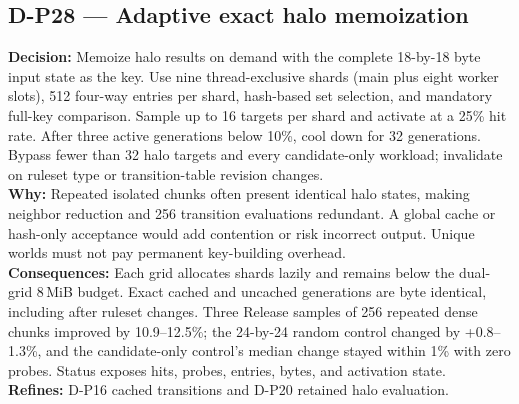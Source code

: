\subsection*{D-P28 --- Adaptive exact halo memoization}
\begin{decisionbox}[title={D-P28 \quad 2026-08-11}]
\textbf{Decision:} Memoize halo results on demand with the complete
18-by-18 byte input state as the key. Use nine thread-exclusive shards (main
plus eight worker slots), 512 four-way entries per shard, hash-based set
selection, and mandatory full-key comparison. Sample up to 16 targets per shard
and activate at a 25\% hit rate. After three active generations below 10\%,
cool down for 32 generations. Bypass fewer than 32 halo targets and every
candidate-only workload; invalidate on ruleset type or transition-table
revision changes.\\
\textbf{Why:} Repeated isolated chunks often present identical halo states,
making neighbor reduction and 256 transition evaluations redundant. A global
cache or hash-only acceptance would add contention or risk incorrect output.
Unique worlds must not pay permanent key-building overhead.\\
\textbf{Consequences:} Each grid allocates shards lazily and remains below the
dual-grid 8\,MiB budget. Exact cached and uncached generations are byte
identical, including after ruleset changes. Three Release samples of 256
repeated dense chunks improved by 10.9--12.5\%; the 24-by-24 random control
changed by +0.8--1.3\%, and the candidate-only control's median change stayed
within 1\% with zero probes. Status exposes hits, probes, entries, bytes, and
activation state.\\
\textbf{Refines:} D-P16 cached transitions and D-P20 retained halo evaluation.
\end{decisionbox}

